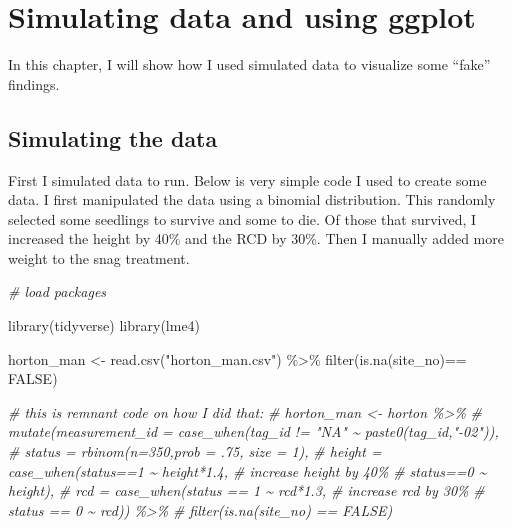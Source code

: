 \documentclass[
]{book}
\newenvironment{Shaded}{\begin{snugshade}}{\end{snugshade}}
\newcommand{\CommentTok}[1]{\textcolor[rgb]{0.56,0.35,0.01}{\textit{#1}}}
\newcommand{\ConstantTok}[1]{\textcolor[rgb]{0.00,0.00,0.00}{#1}}
\newcommand{\FunctionTok}[1]{\textcolor[rgb]{0.00,0.00,0.00}{#1}}
\newcommand{\NormalTok}[1]{#1}
\newcommand{\OtherTok}[1]{\textcolor[rgb]{0.56,0.35,0.01}{#1}}
\newcommand{\SpecialCharTok}[1]{\textcolor[rgb]{0.00,0.00,0.00}{#1}}
\newcommand{\StringTok}[1]{\textcolor[rgb]{0.31,0.60,0.02}{#1}}
\begin{document}
\hypertarget{simulating-data-and-using-ggplot}{%
\chapter{Simulating data and using ggplot}\label{simulating-data-and-using-ggplot}}

In this chapter, I will show how I used simulated data to visualize some ``fake''
findings.

\hypertarget{simulating-the-data}{%
\section{Simulating the data}\label{simulating-the-data}}

First I simulated data to run. Below is very simple code I used to create
some data. I first manipulated the data using a binomial distribution. This
randomly selected some seedlings to survive and some to die. Of those that
survived, I increased the height by 40\% and the RCD by 30\%. Then I manually
added more weight to the snag treatment.

\begin{Shaded}
\begin{Highlighting}[]
\CommentTok{\# load packages }

\FunctionTok{library}\NormalTok{(tidyverse)}
\FunctionTok{library}\NormalTok{(lme4)}

\NormalTok{horton\_man }\OtherTok{\textless{}{-}} \FunctionTok{read.csv}\NormalTok{(}\StringTok{"horton\_man.csv"}\NormalTok{) }\SpecialCharTok{\%\textgreater{}\%}
  \FunctionTok{filter}\NormalTok{(}\FunctionTok{is.na}\NormalTok{(site\_no)}\SpecialCharTok{==} \ConstantTok{FALSE}\NormalTok{)}

\CommentTok{\# this is remnant code on how I did that: }
\CommentTok{\# horton\_man \textless{}{-} horton \%\textgreater{}\%}
  \CommentTok{\# mutate(measurement\_id = case\_when(tag\_id != "NA" \textasciitilde{}  paste0(tag\_id,"{-}02")),}
        \CommentTok{\# status = rbinom(n=350,prob = .75, size = 1),}
        \CommentTok{\# height = case\_when(status==1 \textasciitilde{} height*1.4, \# increase height by 40\%}
                          \CommentTok{\#  status==0 \textasciitilde{} height),}
        \CommentTok{\# rcd = case\_when(status == 1 \textasciitilde{} rcd*1.3, \# increase rcd by 30\%}
                        \CommentTok{\# status == 0 \textasciitilde{} rcd)) \%\textgreater{}\% }
  \CommentTok{\# filter(is.na(site\_no) == FALSE)}
\end{Highlighting}
\end{Shaded}
\end{document}
